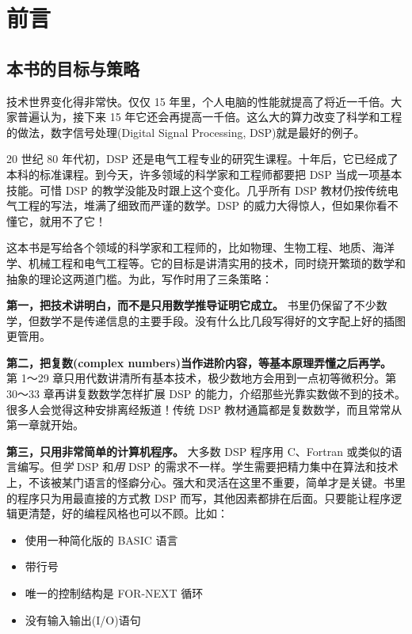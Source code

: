 
\chapter{前言}\label{ch-00b}

\section{本书的目标与策略}

技术世界变化得非常快。仅仅 15
年里，个人电脑的性能就提高了将近一千倍。大家普遍认为，接下来 15
年它还会再提高一千倍。这么大的算力改变了科学和工程的做法，数字信号处理(Digital
Signal Processing, DSP)就是最好的例子。

20 世纪 80 年代初，DSP
还是电气工程专业的研究生课程。十年后，它已经成了本科的标准课程。到今天，许多领域的科学家和工程师都要把
DSP 当成一项基本技能。可惜 DSP 的教学没能及时跟上这个变化。几乎所有 DSP
教材仍按传统电气工程的写法，堆满了细致而严谨的数学。DSP
的威力大得惊人，但如果你看不懂它，就用不了它！

这本书是写给各个领域的科学家和工程师的，比如物理、生物工程、地质、海洋学、机械工程和电气工程等。它的目标是讲清实用的技术，同时绕开繁琐的数学和抽象的理论这两道门槛。为此，写作时用了三条策略：

\textbf{第一，把技术讲明白，而不是只用数学推导证明它成立。}
书里仍保留了不少数学，但数学不是传递信息的主要手段。没有什么比几段写得好的文字配上好的插图更管用。

\textbf{第二，把复数(complex
numbers)当作进阶内容，等基本原理弄懂之后再学。} 第 1～29
章只用代数讲清所有基本技术，极少数地方会用到一点初等微积分。第 30～33
章再讲复数数学怎样扩展 DSP
的能力，介绍那些光靠实数做不到的技术。很多人会觉得这种安排离经叛道！传统
DSP 教材通篇都是复数数学，而且常常从第一章就开始。

\textbf{第三，只用非常简单的计算机程序。} 大多数 DSP 程序用 C、Fortran
或类似的语言编写。但\emph{学} DSP 和\emph{用} DSP
的需求不一样。学生需要把精力集中在算法和技术上，不该被某门语言的怪癖分心。强大和灵活在这里不重要，简单才是关键。书里的程序只为用最直接的方式教
DSP
而写，其他因素都排在后面。只要能让程序逻辑更清楚，好的编程风格也可以不顾。比如：

\begin{itemize}
\tightlist
\item
  使用一种简化版的 BASIC 语言
\item
  带行号
\item
  唯一的控制结构是 FOR-NEXT 循环
\item
  没有输入输出(I/O)语句
\end{itemize}

